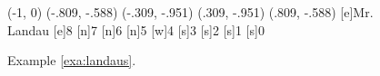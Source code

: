 \begin{figure}[ht]
\begin{minipage}{.3\textwidth}
\begin{graph}
(-1, 0) %
(-.809, -.588) %
(-.309, -.951) %
(.309, -.951) %
(.809, -.588) %
[e]{Mr. Landau} [e]{8}
[n]{7} [n]{6}
[n]{5} [w]{4}
[s]{3} [s]{2}
[s]{1} [s]{0} 
    
    
   
 
\end{graph}\vspace*{.5in}\caption{Example
\ref{exa:landaus}.} \label{fig:landaus3}
\end{minipage}
\end{figure}

